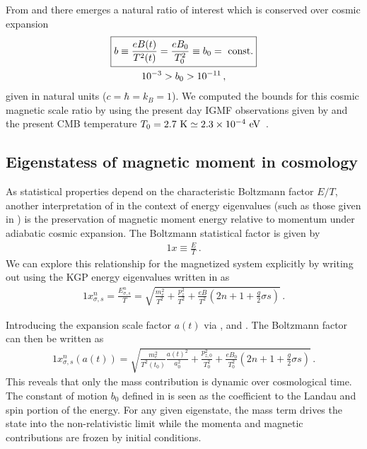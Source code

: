 From  and  there emerges a natural ratio of interest which is conserved over cosmic expansion 
\begin{gather}
 \label{tbscale}
 \boxed{b\equiv\frac{e{B}(t)}{T^{2}(t)}=\frac{e{B}_{0}}{T_{0}^{2}}\equiv b_0={\rm\ const.}}\\
 10^{-3}>b_{0}>10^{-11}\,,
\end{gather}
given in natural units ($c=\hbar=k_{B}=1$). We computed the bounds for this cosmic magnetic scale ratio by using the present day IGMF observations given by  and the present CMB temperature $T_{0}=2.7{\rm\ K}\simeq2.3\times10^{-4}\eV$~\cite{Planck:2018vyg}.

\subsection{Eigenstatess of magnetic moment in cosmology}
\label{sec:protection}

As statistical properties depend on the characteristic Boltzmann factor $E/T$, another interpretation of  in the context of energy eigenvalues (such as those given in ) is the preservation of magnetic moment energy relative to momentum under adiabatic cosmic expansion. The Boltzmann statistical factor is given by
\begin{alignat}{1}
    \label{Boltz} x\equiv\frac{E}{T}\,.
\end{alignat}
We can explore this relationship for the magnetized system explicitly by writing out  using the KGP energy eigenvalues written in  as
\begin{alignat}{1}
    \label{XExplicit} x_{\sigma,s}^{n} = \frac{E_{\sigma,s}^{n}}{T} = \sqrt{\frac{m_{e}^{2}}{T^{2}}+\frac{p_{z}^{2}}{T^{2}}+\frac{eB}{T^{2}}\left(2n+1+\frac{g}{2}\sigma s\right)}\,.
\end{alignat}

Introducing the expansion scale factor $a(t)$ via ,  and . The Boltzmann factor can then be written as
\begin{alignat}{1}
    \label{xscale:1} x_{\sigma,s}^{n}(a(t)) = \sqrt{\frac{m_{e}^{2}}{T^{2}(t_{0})}\frac{a(t)^{2}}{a_{0}^{2}}+\frac{p_{z,0}^{2}}{T_{0}^{2}}+\frac{eB_{0}}{T_{0}^{2}}\left(2n+1+\frac{g}{2}\sigma s\right)}\,.
\end{alignat}
This reveals that only the mass contribution is dynamic over cosmological time. The constant of motion $b_{0}$ defined in  is seen as the coefficient to the Landau and spin portion of the energy. For any given eigenstate, the mass term drives the state into the non-relativistic limit while the momenta and magnetic contributions are frozen by initial conditions. 


